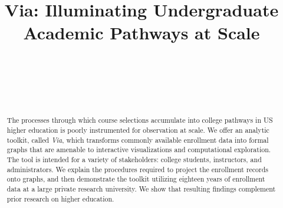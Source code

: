 \documentclass{sigchi}
\def\plaintitle{Via: Illuminating Undergraduate Academic Pathways at Scale}
\begin{document}
\title{\plaintitle}

\author{%
  \\
  \\
  \\
  \\
}

\maketitle

\begin{abstract}
The processes through which course selections accumulate into college
pathways in US higher education is poorly instrumented for observation
at scale. We offer an analytic toolkit, called {\em Via}, which
transforms commonly available enrollment data into formal graphs that
are amenable to interactive visualizations and computational
exploration. The tool is intended for a variety of stakeholders:
college students, instructors, and administrators. We explain the
procedures required to project the enrollment records onto graphs, and
then demonstrate the toolkit utilizing eighteen years of enrollment
data at a large private research university. We show that resulting
findings complement prior research on higher education.
 \end{abstract}


\end{document}
